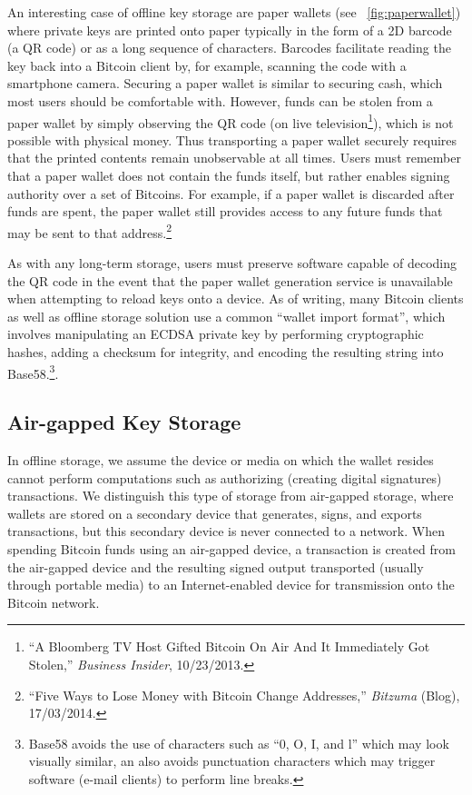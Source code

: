 An interesting case of offline key storage are paper wallets (see ~\autoref{fig:paperwallet})
where private keys are printed onto paper typically in the form of a 2D barcode (\eg a QR code) or as a long sequence of characters. Barcodes facilitate reading the key back into a Bitcoin client by, for example, scanning the code with a smartphone camera. Securing a paper wallet is similar to securing cash, which most users should be comfortable with. However, funds can be stolen from a paper wallet by simply observing the QR code (\eg on live television\footnote{``A Bloomberg TV Host Gifted Bitcoin On Air And It Immediately Got Stolen,'' \textit{Business Insider}, 10/23/2013.}), which is not possible with physical money. Thus transporting a paper wallet securely requires that the printed contents remain unobservable at all times.  Users must remember that a paper wallet does not contain the funds itself, but rather enables signing authority over a set of Bitcoins. For example, if a paper wallet is discarded after funds are spent, the paper wallet still provides access to any future funds that may be sent to that address.\footnote{``Five Ways to Lose Money with Bitcoin Change Addresses,'' \textit{Bitzuma} (Blog), 17/03/2014.} 


As with any long-term storage, users must preserve software capable of decoding the QR code in the event that the paper wallet generation service is unavailable when attempting to reload keys onto a device. As of writing, many Bitcoin clients as well as offline storage solution use a common ``wallet import format'', which involves manipulating an ECDSA private key by performing cryptographic hashes, adding a checksum for integrity, and encoding the resulting string into Base58.\footnote{Base58 avoids the use of characters such as ``0, O, I, and l'' which may look visually similar, an also avoids punctuation characters which may trigger software (\eg e-mail clients) to perform line breaks.}.

\subsection{Air-gapped Key Storage}
In offline storage, we assume the device or media on which the wallet resides cannot perform computations such as authorizing (\ie creating digital signatures) transactions. We distinguish this type of storage from air-gapped storage, where wallets are stored on a secondary device that generates, signs, and exports transactions, but this secondary device is never connected to a network. When spending Bitcoin funds using an air-gapped device, a transaction is created from the air-gapped device and the resulting signed output transported (usually through portable media) to an Internet-enabled device for transmission onto the Bitcoin network. 

